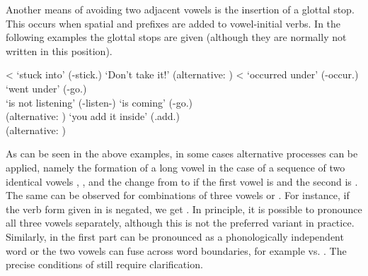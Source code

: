 Another means of avoiding two adjacent vowels is the insertion of a glottal stop. This occurs when spatial  and  prefixes are added to vowel-initial verbs. In the following examples the glottal stops are given (although they are normally not written in this position).
%
\begin{exe}
	\ex	\label{ex:glottal stop inversion phon}
	\begin{xlist}
		\TabPositions{3em}
		\ex	{}	\tab	{} <  `stuck into' (-stick.)
		\ex	\label{Don't take it!Phon}  	\tab	{} `Don't take it!'	(alternative: )	
		\ex	{}	\tab	{} <  	`occurred under' (-occur.)
		\ex	{}	\tab	{}	`went under' (-go.)\\
		\tab \tab {} `is not listening' (-listen-)
		\ex	\label{hitherGOPHON}  	\tab	{} `is coming' (-go.)\\ 
		\tab \tab (alternative: )	
		\ex	{}	\tab	{} 	
		\ex	\label{insideADDPHON} 	\tab	{} `you add it inside' (.add.)\\
		\tab \tab (alternative: )	
	\end{xlist}
\end{exe}

As can be seen in the above examples, in some cases alternative processes can be applied, namely the formation of a long vowel in the case of a sequence of two identical vowels , , and the change from  to  if the first vowel is  and the second is  . The same can be observed for combinations of three vowels or . For instance, if the verb form  given in  is negated, we get . In principle, it is possible to pronounce all three vowels separately, although this is not the preferred variant in practice. Similarly, in  the first part can be pronounced as a phonologically independent word or the two vowels can fuse across word boundaries, for example  vs.  . The precise conditions of  still require clarification.


